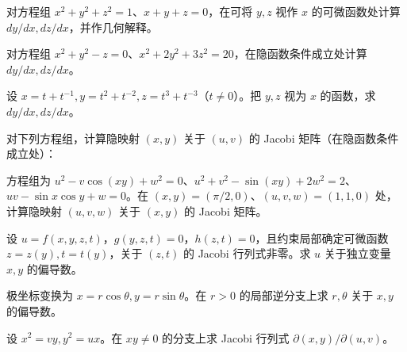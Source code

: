 \noindent\begin{minipage}{\textwidth}
对方程组 $x^2+y^2+z^2=1$、$x+y+z=0$，在可将 $y,z$ 视作 $x$ 的可微函数处计算 $dy/dx,dz/dx$，并作几何解释。
\end{minipage}\par\vfill
\newpage
\noindent\begin{minipage}{\textwidth}
对方程组 $x^2+y^2-z=0$、$x^2+2y^2+3z^2=20$，在隐函数条件成立处计算 $dy/dx,dz/dx$。
\end{minipage}\par\vfill
\noindent\begin{minipage}{\textwidth}
设 $x=t+t^{-1},y=t^2+t^{-2},z=t^3+t^{-3}$（$t\ne0$）。把 $y,z$ 视为 $x$ 的函数，求 $dy/dx,dz/dx$。
\end{minipage}\par\vfill
\noindent\begin{minipage}{\textwidth}
对下列方程组，计算隐映射 $(x,y)$ 关于 $(u,v)$ 的 Jacobi 矩阵（在隐函数条件成立处）：
\end{minipage}\par\vfill
\newpage
\noindent\begin{minipage}{\textwidth}
方程组为 $u^2-v\cos(xy)+w^2=0$、$u^2+v^2-\sin(xy)+2w^2=2$、$uv-\sin x\cos y+w=0$。在 $(x,y)=(\pi/2,0)$、$(u,v,w)=(1,1,0)$ 处，计算隐映射 $(u,v,w)$ 关于 $(x,y)$ 的 Jacobi 矩阵。
\end{minipage}\par\vfill
\noindent\begin{minipage}{\textwidth}
设 $u=f(x,y,z,t)$，$g(y,z,t)=0$，$h(z,t)=0$，且约束局部确定可微函数 $z=z(y),t=t(y)$，关于 $(z,t)$ 的 Jacobi 行列式非零。求 $u$ 关于独立变量 $x,y$ 的偏导数。
\end{minipage}\par\vfill
\noindent\begin{minipage}{\textwidth}
极坐标变换为 $x=r\cos\theta,y=r\sin\theta$。在 $r>0$ 的局部逆分支上求 $r,\theta$ 关于 $x,y$ 的偏导数。
\end{minipage}\par\vfill
\newpage
\noindent\begin{minipage}{\textwidth}
设 $x^2=vy,y^2=ux$。在 $xy\ne0$ 的分支上求 Jacobi 行列式 $\partial(x,y)/\partial(u,v)$。
\end{minipage}\par\vfill
